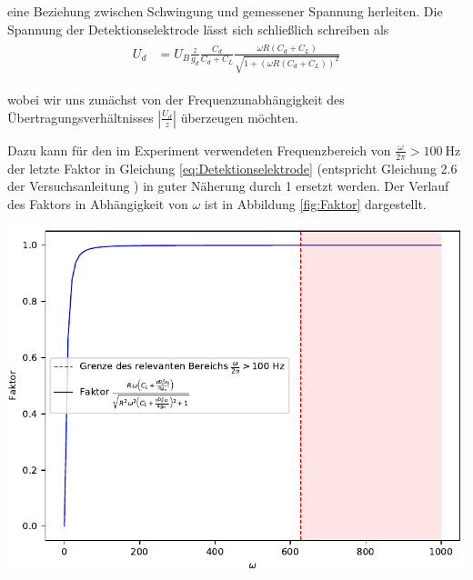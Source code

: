 eine Beziehung zwischen Schwingung und gemessener Spannung herleiten.
Die Spannung der Detektionselektrode lässt sich schließlich schreiben als
\begin{align}
    \label{eq:Detektionselektrode}
    \begin{split}
        U_d &= U_B \frac{z}{g_d} \frac{C_d}{C_d + C_L} \frac{\omega R \left( C_d + C_L \right)}{\sqrt{1+\left( \omega R \left( C_d + C_L \right) \right)^2}}
    \end{split}
\end{align}

wobei wir uns zunächst von der Frequenzunabhängigkeit des Übertragungsverhältnisses $\left| \frac{U_d}{z} \right|$ überzeugen möchten.

Dazu kann für den im Experiment verwendeten Frequenzbereich von $\frac{\omega}{2\pi} > \SI{100}{\hertz}$ der letzte Faktor in Gleichung \ref{eq:Detektionselektrode} (entspricht Gleichung 2.6 der Versuchsanleitung \cite{Anleitung}) in guter Näherung durch \SI{1}{} ersetzt werden.
Der Verlauf des Faktors in Abhängigkeit von $\omega$ ist in Abbildung \ref{fig:Faktor} dargestellt.

\minipage{\linewidth}
    \begin{center}
        \captionsetup{type=figure}
        \begin{adjustbox}{max width=\linewidth, keepaspectratio}
            \includegraphics[]{pdf/Faktor}
        \end{adjustbox}
        \label{fig:Faktor}
    \end{center}
\endminipage

